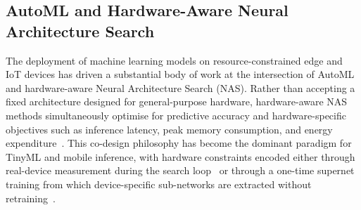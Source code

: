 

\subsection{AutoML and Hardware-Aware Neural Architecture Search}
\label{subsec:automl-nas}

The deployment of machine learning models on resource-constrained
edge and IoT devices has driven a substantial body of work at the
intersection of AutoML and hardware-aware Neural Architecture Search
(NAS).
Rather than accepting a fixed architecture designed for
general-purpose hardware, hardware-aware NAS methods simultaneously
optimise for predictive accuracy and hardware-specific objectives
such as inference latency, peak memory consumption, and energy
expenditure~\cite{benmeziane2021hwnas}.
This co-design philosophy has become the dominant paradigm for
TinyML and mobile inference, with hardware constraints encoded
either through real-device measurement during the search
loop~\cite{tan2019mnasnet} or through a one-time supernet
training from which device-specific sub-networks are extracted
without retraining~\cite{cai2020ofa}.

